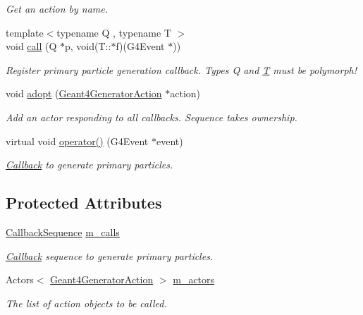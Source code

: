 \begin{DoxyCompactItemize}
\begin{DoxyCompactList}\small\item\em Get an action by name. \end{DoxyCompactList}\item 
{\footnotesize template$<$typename Q , typename T $>$ }\\void \hyperlink{class_d_d4hep_1_1_simulation_1_1_geant4_generator_action_sequence_acec7af6b593bd3e1105abea622ea7127}{call} (Q $\ast$p, void(T\+::$\ast$f)(G4\+Event $\ast$))
\begin{DoxyCompactList}\small\item\em Register primary particle generation callback. Types Q and \hyperlink{class_t}{T} must be polymorph! \end{DoxyCompactList}\item 
void \hyperlink{class_d_d4hep_1_1_simulation_1_1_geant4_generator_action_sequence_ac6d847bdeeaa2b6bd46f1ae89fc15277}{adopt} (\hyperlink{class_d_d4hep_1_1_simulation_1_1_geant4_generator_action}{Geant4\+Generator\+Action} $\ast$action)
\begin{DoxyCompactList}\small\item\em Add an actor responding to all callbacks. Sequence takes ownership. \end{DoxyCompactList}\item 
virtual void \hyperlink{class_d_d4hep_1_1_simulation_1_1_geant4_generator_action_sequence_a60e6a124a4d378fbf6a980137f5290cf}{operator()} (G4\+Event $\ast$event)
\begin{DoxyCompactList}\small\item\em \hyperlink{class_d_d4hep_1_1_callback}{Callback} to generate primary particles. \end{DoxyCompactList}\end{DoxyCompactItemize}
\subsection*{Protected Attributes}
\begin{DoxyCompactItemize}
\item 
\hyperlink{struct_d_d4hep_1_1_callback_sequence}{Callback\+Sequence} \hyperlink{class_d_d4hep_1_1_simulation_1_1_geant4_generator_action_sequence_a3861258f355c58bb19602e7d099c1c9e}{m\+\_\+calls}
\begin{DoxyCompactList}\small\item\em \hyperlink{class_d_d4hep_1_1_callback}{Callback} sequence to generate primary particles. \end{DoxyCompactList}\item 
Actors$<$ \hyperlink{class_d_d4hep_1_1_simulation_1_1_geant4_generator_action}{Geant4\+Generator\+Action} $>$ \hyperlink{class_d_d4hep_1_1_simulation_1_1_geant4_generator_action_sequence_a89614165b2d4cf32bbed637abca203d1}{m\+\_\+actors}
\begin{DoxyCompactList}\small\item\em The list of action objects to be called. \end{DoxyCompactList}\end{DoxyCompactItemize}

